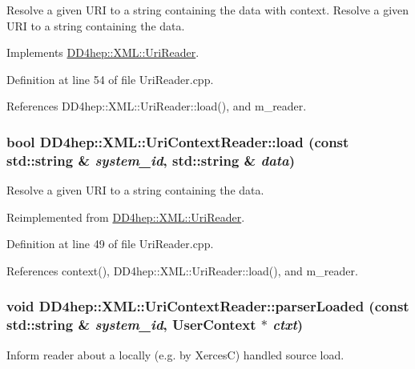 Resolve a given URI to a string containing the data with context. Resolve a given URI to a string containing the data. 

Implements \hyperlink{class_d_d4hep_1_1_x_m_l_1_1_uri_reader_a80a35ded7f30ba3b1954edb0e0493d6f}{DD4hep::XML::UriReader}.

Definition at line 54 of file UriReader.cpp.

References DD4hep::XML::UriReader::load(), and m\_\-reader.\hypertarget{class_d_d4hep_1_1_x_m_l_1_1_uri_context_reader_a1a6ca7eb85dadbc69463a367f396fe72}{
\subsubsection[{load}]{\setlength{\rightskip}{0pt plus 5cm}bool DD4hep::XML::UriContextReader::load (const std::string \& {\em system\_\-id}, \/  std::string \& {\em data})}}
\label{class_d_d4hep_1_1_x_m_l_1_1_uri_context_reader_a1a6ca7eb85dadbc69463a367f396fe72}


Resolve a given URI to a string containing the data. 

Reimplemented from \hyperlink{class_d_d4hep_1_1_x_m_l_1_1_uri_reader_a4cb644360608b580a1aaa4ccb9a8c7fa}{DD4hep::XML::UriReader}.

Definition at line 49 of file UriReader.cpp.

References context(), DD4hep::XML::UriReader::load(), and m\_\-reader.\hypertarget{class_d_d4hep_1_1_x_m_l_1_1_uri_context_reader_ad55127447ec6782a4bf610ea2a33e233}{
\subsubsection[{parserLoaded}]{\setlength{\rightskip}{0pt plus 5cm}void DD4hep::XML::UriContextReader::parserLoaded (const std::string \& {\em system\_\-id}, \/  {\bf UserContext} $\ast$ {\em ctxt})}}
\label{class_d_d4hep_1_1_x_m_l_1_1_uri_context_reader_ad55127447ec6782a4bf610ea2a33e233}


Inform reader about a locally (e.g. by XercesC) handled source load. 

